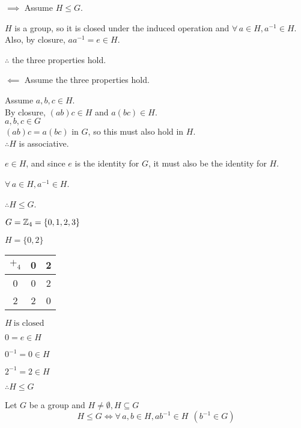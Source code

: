 \documentclass[letterpaper,12pt,fleqn]{article}
\begin{document}
\begin{theproof}
  \listbreak
  \begin{description}
  \item{$\implies$} Assume $H\le G$.

    $H$ is a group, so it is closed under the induced operation and
    $\forall\,a\in H,a^{-1}\in H$. Also, by closure, $aa^{-1}=e\in H$.

    $\therefore$ the three properties hold.
    
  \item{$\impliedby$} Assume the three properties hold.

    Assume $a,b,c\in H$. \\
    By closure, $(ab)c\in H$ and $a(bc)\in H$. \\
    $a,b,c\in G$ \\
    $(ab)c=a(bc)$ in $G$, so this must also hold in $H$. \\
    $\therefore H$ is associative.

    $e\in H$, and since $e$ is the identity for $G$, it must also be the
    identity for $H$.

    $\forall\,a\in H,a^{-1}\in H$.

    $\therefore H\le G$.
  \end{description}
\end{theproof}
\newpage
\begin{example}
  $G=\mathbb{Z}_4=\{0,1,2,3\}$
  
  $H=\{0,2\}$

  \bigskip

  \begin{tabular}{c|cc}
    $+_4$ & 0 & 2 \\
    \hline
    0 & 0 & 2 \\
    2 & 2 & 0 \\
  \end{tabular}

  \bigskip

  $H\ \mbox{is closed}$
  
  $0=e\in H$
  
  $0^{-1}=0\in H$
  
  $2^{-1}=2\in H$
  
  $\therefore H\le G$
\end{example}

\begin{theorem}
  Let $G$ be a group and $H\ne\emptyset,H\subseteq G$
  \[H\le G\iff \forall\,a,b\in H,ab^{-1}\in H\ \ (b^{-1}\in G)\]
\end{theorem}
\end{document}
